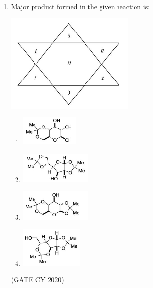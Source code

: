 \documentclass[12pt]{article}
\begin{document}
\begin{enumerate}
\item Major product formed in the given reaction is:

\begin{center}
\includegraphics[width=0.4\columnwidth]{figs/Q7.png}
\label{fig:Q7}
\end{center}

\begin{enumerate}
    \item \includegraphics[width=0.4\columnwidth]{figs/q7a.png}
\label{fig:q7a}
    \item \includegraphics[width=0.4\columnwidth]{figs/q7b.png}
\label{fig:q7b}
    \item \includegraphics[width=0.4\columnwidth]{figs/q7c.png}
\label{fig:q7c}
    \item \includegraphics[width=0.4\columnwidth]{figs/q7d.png}
\label{fig:q7d}
\end{enumerate}
\hfill (GATE CY 2020)


\end{enumerate}
\end{document}
